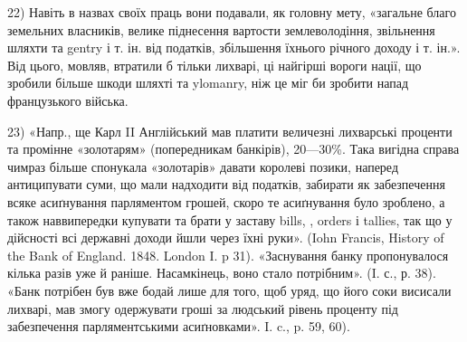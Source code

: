 22) Навіть в назвах своїх праць вони подавали, як головну мету, «загальне благо земельних
власників, велике піднесення вартости землеволодіння, звільнення шляхти та gentry і т. ін. від
податків,
збільшення їхнього річного доходу і т. ін.». Від цього, мовляв, втратили б тільки лихварі, ці
найгірші
вороги нації, що зробили більше шкоди шляхті та ylomanry, ніж це міг би зробити напад французького
війська.

23) «Напр., ще Карл II Англійський мав платити величезні лихварські проценти та промінне
«золотарям» (попередникам банкірів), 20—30\%. Така вигідна справа чимраз більше спонукала «золотарів»
давати королеві позики, наперед антиципувати суми, що мали надходити від податків, забирати
як забезпечення всяке асиґнування парляментом грошей, скоро те асиґнування було зроблено, а також
наввипередки купувати та брати у заставу bills, , orders і tallies, так що у дійсності всі державні
доходи
йшли через їхні руки». (Iohn Francis, History of the Bank of England. 1848. London I. p 31).
«Заснування
банку пропонувалося кілька разів уже й раніше. Насамкінець, воно стало потрібним». (I. с., р. 38).
«Банк потрібен був вже бодай лише для того, щоб уряд, що його соки висисали лихварі, мав змогу
одержувати гроші за людський рівень проценту під забезпечення парляментськими асиґновками».
I. c., p. 59, 60).
